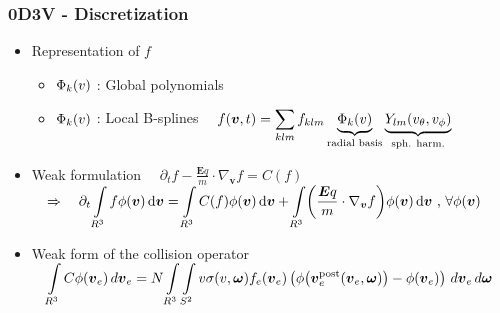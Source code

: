 \documentclass[mathserif, aspectratio=169]{beamer}
\newcommand{\ud}{\,\mathrm{d}}
\newcommand{\vect}[1]{\boldsymbol{#1}}
\newcommand{\of}[1]{\mleft( #1 \mright)}
\newcommand{\myint}{\int\limits}
\newcommand{\diff}[1]{\, d#1}
\begin{document}
\begin{frame}
	\frametitle{0D3V - Discretization}
	\small
	\begin{itemize}
		\item Representation of $f$
		\begin{itemize}
			\item $\Phi_k\of{v}$ : Global polynomials
			\item $\Phi_k\of{v}$ : Local B-splines
			$
			\displaystyle
			\quad 
			f(\vect{v},t) = \sum_{klm} f_{klm} \underbrace{\Phi_k\of{v}}_{\text{radial basis}} \underbrace{Y_{lm}\of{v_\theta, v_\phi}}_{\tiny\text{sph. harm.}}$ 
		\end{itemize}
		\item Weak formulation
			$
			\displaystyle
			\quad
			\partial_t f - \frac{\vect{E} q}{m} \cdot \nabla_{\vect{v}}f = C(f)
			\quad $ \\
			$
			\displaystyle
			\quad
			\Rightarrow \quad
			\partial_t \myint_{R^3} f \phi\of{\vect{v}} \ud \vect{v} = 
			\myint_{R^3} C(f) \phi\of{\vect{v}} \ud \vect{v} + \myint_{R^3} \of{\frac{\vect{E} q}{m} \cdot \nabla_{\vect{v}} f} \phi(\vect{v}) \ud \vect{v}\text{ , } 
			\forall \phi(\vect{v})$
		\item Weak form of the collision operator \\
			$
			\displaystyle
			\quad 
			\myint_{R^3} C \phi\of{\vect{v}_e} \diff{\vect{v}_e} 
			=
			N \myint_{R^3} \myint_{S^2} 
			v\sigma(v,\vect{\omega})
			f_e\of{\vect{v}_e}
			\left(
			\phi\of{\vect{v}_e^\text{post}\of{\vect{v}_e, \vect{\omega}}} 
			- \phi\of{\vect{v}_e} 
			\right)
			\diff{\vect{v}_e} \diff{\vect{\omega}}
			$
	\end{itemize}
\end{frame}
\end{document}
